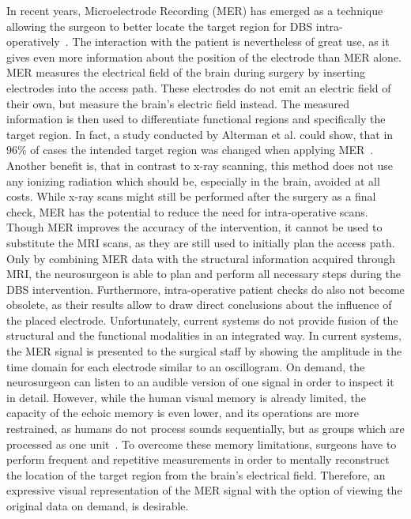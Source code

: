 \documentclass[journal]{vgtc}                %
\begin{document}
In recent years, Microelectrode Recording (MER) has emerged as a technique allowing the surgeon to better locate the target region for DBS intra-operatively~\cite{Lenz1988}. The interaction with the patient is nevertheless of great use, as it gives even more information about the position of the electrode than MER alone. MER measures the electrical field of the brain during surgery by inserting electrodes into the access path. These electrodes do not emit an electric field of their own, but measure the brain's electric field instead. The measured information is then used to differentiate functional regions and specifically the target region. In fact, a study conducted by Alterman et al. could show, that in 96\% of cases the intended target region was changed when applying MER~\cite{Alterman1999}. Another benefit is, that in contrast to x-ray scanning, this method does not use any ionizing radiation which should be, especially in the brain, avoided at all costs. While x-ray scans might still be performed after the surgery as a final check, MER has the potential to reduce the need for intra-operative scans. Though MER improves the accuracy of the intervention, it cannot be used to substitute the MRI scans, as they are still used to initially plan the access path. Only by combining MER data with the structural information acquired through MRI, the neurosurgeon is able to plan and perform all necessary steps during the DBS intervention. Furthermore, intra-operative patient checks do also not become obsolete, as their results allow to draw direct conclusions about the influence of the placed electrode. Unfortunately, current systems do not provide fusion of the structural and the functional modalities in an integrated way. In current systems, the MER signal is presented to the surgical staff by showing the amplitude in the time domain for each electrode similar to an oscillogram. On demand, the neurosurgeon can listen to an audible version of one signal in order to inspect it in detail. However, while the human visual memory is already limited, the capacity of the echoic memory is even lower, and its operations are more restrained, as humans do not process sounds sequentially, but as groups which are processed as one unit~\cite{Radvansky2005}. To overcome these memory limitations, surgeons have to perform frequent and repetitive measurements in order to mentally reconstruct the location of the target region from the brain's electrical field. Therefore, an expressive visual representation of the MER signal with the option of viewing the original data on demand, is desirable.
\end{document}
